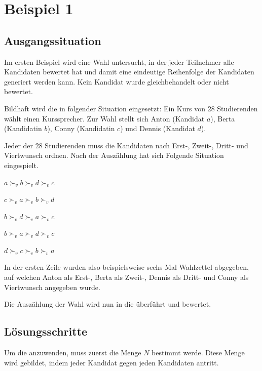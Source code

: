 \section{Beispiel 1}
\label{sec:beispiel1}


\subsection{Ausgangssituation} 
\label{sec:ausgangssituation1}
Im ersten Beispiel wird eine Wahl untersucht, in der jeder Teilnehmer alle Kandidaten bewertet hat und damit eine eindeutige Reihenfolge der Kandidaten generiert werden kann. Kein Kandidat wurde gleichbehandelt oder nicht bewertet.

Bildhaft wird die \schulze in folgender Situation eingesetzt:
Ein Kurs von 28 Studierenden wählt einen Kurssprecher. Zur Wahl stellt sich Anton (Kandidat $a$), Berta (Kandidatin $b$), Conny (Kandidatin $c$) und Dennis (Kandidat $d$).

Jeder der 28 Studierenden muss die Kandidaten nach Erst-, Zweit-, Dritt- und Viertwunsch ordnen. Nach der Auszählung hat sich Folgende Situation eingespielt. 

\begin{description}
\centering
\item[6 mal] $a \succ_{v} b \succ_{v} d \succ_{v}c$
\item[4 mal] $c \succ_{v} a \succ_{v} b \succ_{v}d$
\item[10 mal] $b \succ_{v} d \succ_{v} a \succ_{v}c$
\item[3 mal] $b \succ_{v} a \succ_{v} d \succ_{v}c$
\item[5 mal] $d \succ_{v} c \succ_{v} b \succ_{v}a$
\end{description}

In der ersten Zeile wurden also beispielsweise sechs Mal Wahlzettel abgegeben, auf welchen Anton als Erst-, Berta als Zweit-, Dennis als Dritt- und Conny als Viertwunsch angegeben wurde.

Die Auszählung der Wahl wird nun in die \schulze überführt und bewertet.
\newpage
\subsection{Lösungsschritte} 
\label{sec:loesungen1}
Um die \schulze anzuwenden, muss zuerst die Menge $N$ bestimmt werde. Diese Menge wird gebildet, indem jeder Kandidat gegen jeden Kandidaten antritt.

